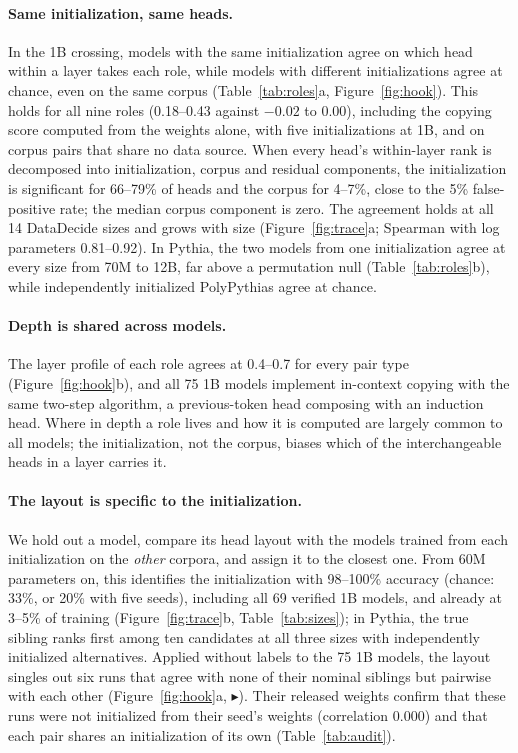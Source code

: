 \documentclass[11pt]{article}
\begin{document}
\paragraph{Same initialization, same heads.}
In the 1B crossing, models with the same initialization agree on which head within a layer takes each role, while models with different initializations agree at chance, even on the same corpus (Table~\ref{tab:roles}a, Figure~\ref{fig:hook}).
This holds for all nine roles (0.18--0.43 against $-0.02$ to $0.00$), including the copying score computed from the weights alone, with five initializations at 1B, and on corpus pairs that share no data source.
When every head's within-layer rank is decomposed into initialization, corpus and residual components, the initialization is significant for 66--79\% of heads and the corpus for 4--7\%, close to the 5\% false-positive rate; the median corpus component is zero.
The agreement holds at all 14 DataDecide sizes and grows with size (Figure~\ref{fig:trace}a; Spearman with log parameters 0.81--0.92).
In Pythia, the two models from one initialization agree at every size from 70M to 12B, far above a permutation null (Table~\ref{tab:roles}b), while independently initialized PolyPythias agree at chance.

\paragraph{Depth is shared across models.}
The layer profile of each role agrees at 0.4--0.7 for every pair type (Figure~\ref{fig:hook}b), and all 75 1B models implement in-context copying with the same two-step algorithm, a previous-token head composing with an induction head.
Where in depth a role lives and how it is computed are largely common to all models; the initialization, not the corpus, biases which of the interchangeable heads in a layer carries it.

\paragraph{The layout is specific to the initialization.}
We hold out a model, compare its head layout with the models trained from each initialization on the \emph{other} corpora, and assign it to the closest one.
From 60M parameters on, this identifies the initialization with 98--100\% accuracy (chance: 33\%, or 20\% with five seeds), including all 69 verified 1B models, and already at 3--5\% of training (Figure~\ref{fig:trace}b, Table~\ref{tab:sizes}); in Pythia, the true sibling ranks first among ten candidates at all three sizes with independently initialized alternatives.
Applied without labels to the 75 1B models, the layout singles out six runs that agree with none of their nominal siblings but pairwise with each other (Figure~\ref{fig:hook}a, $\blacktriangleright$).
Their released weights confirm that these runs were not initialized from their seed's weights (correlation 0.000) and that each pair shares an initialization of its own (Table~\ref{tab:audit}).
\end{document}
